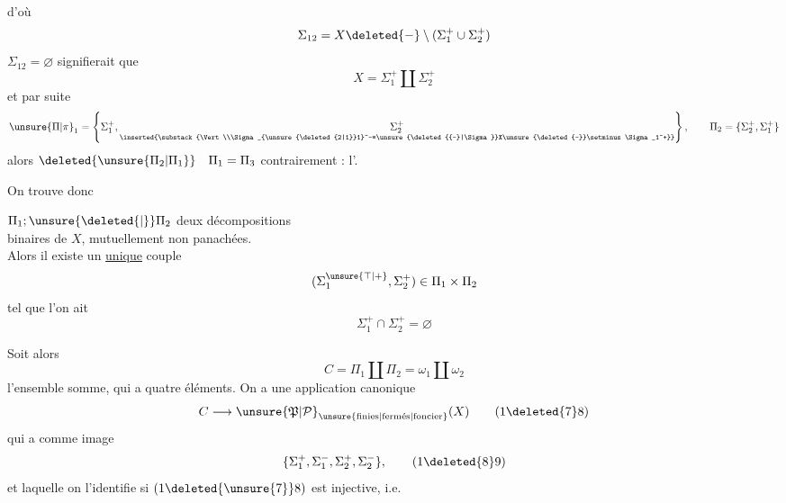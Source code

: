d'où
\[
\Sigma_{12}=X\deleted{-}\setminus(\Sigma_1^+\cup\Sigma_2^+)
\]
 $\Sigma_{12}=\varnothing$ signifierait que
\[
X=\Sigma_1^+\amalg\Sigma_2^+
\]
et par suite
\[
\unsure{\Pi|\pi}_1=\left\{\Sigma_1^+,\underset{\inserted{\substack{\Vert\\\Sigma_{\unsure{\deleted{2|1}}1}^-=\unsure{\deleted{{-}|\Sigma}}X\unsure{\deleted{-}}\setminus\Sigma_1^+}}}{\Sigma_2^+}\right\},
\qquad \Pi_2=\{\Sigma_2^+,\Sigma_1^+\}
\]
alors $\deleted{\unsure{\Pi_2|\Pi_1}}\quad\Pi_1=\Pi_3$ contrairement : l'.

On trouve donc

\noindent{}   $\Pi_1;\unsure{\deleted{\vert}}\Pi_2$ deux décompositions\\
\makebox[0pt][r]{\rule[-2.7ex]{.4pt}{3.8ex}\hspace{.45em}}binaires de $X$, mutuellement non panachées.\\
Alors il existe un \uline{unique} couple
\[
(\Sigma_1^{\unsure{\top|+}},\Sigma_2^+)\in\Pi_1\times\Pi_2
\]
\noindent\makebox[0pt][r]{\rule[-.35ex]{.4pt}{2ex}\hspace{.45em}}tel que l'on ait
\[
\Sigma_1^+\cap\Sigma_2^+=\varnothing
\]

\begingroup\makeatletter\tagsleft@true\makeatother
Soit alors
\[
C=\Pi_1\amalg\Pi_2=\omega_1\amalg\omega_2
\tag*{(17)}
\]
l'ensemble somme, qui a quatre éléments. On a une application canonique
\[
C\longrightarrow{\unsure{\mathfrak{P}|\mathcal{P}}}_{\unsure{\mathrm{finies}|\mathrm{ferm\acute{e}s}|\mathrm{foncier}}}(X)
\tag*{(1\deleted{7}8)}
\]
qui a comme image
\[
\{\Sigma_1^+,\Sigma_1^-,\Sigma_2^+,\Sigma_2^-\},
\tag*{(1\deleted{8}9)}
\]
et laquelle on l'identifie si $(1\deleted{\unsure{7}}8)$ est injective, i.e.
\endgroup
\clearpage
